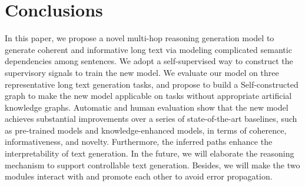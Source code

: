 \documentclass[letterpaper]{article} %
\begin{document}
\section{Conclusions}
In this paper, we propose a
novel multi-hop reasoning generation model to generate coherent and informative long text via modeling complicated semantic dependencies among sentences. We adopt a self-supervised way to construct the supervisory signals to train the new model.
We evaluate our model on three representative long text generation tasks, and propose to build a Self-constructed graph to make the new model applicable on tasks without appropriate artificial knowledge graphs. Automatic and human evaluation show that the new model achieves substantial improvements  over a series of state-of-the-art baselines, such as pre-trained models and knowledge-enhanced models, in terms of coherence, informativeness, and novelty. 
Furthermore, the inferred paths enhance the interpretability of text generation. In the future, we will elaborate the reasoning mechanism to support controllable text generation. Besides, we will make the two modules interact with and promote each other to  avoid
error propagation. 

% 

\clearpage
\appendix
\end{document}
